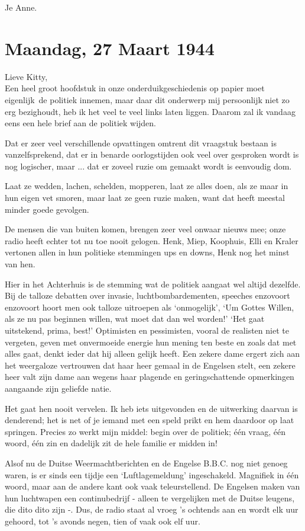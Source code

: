 \documentclass{book}
\begin{document}
Je Anne.

\section*{Maandag, 27 Maart 1944}

Lieve Kitty,\\
Een heel groot hoofdstuk in onze onderduikgeschiedenis op papier
moet eigenlijk~de politiek innemen, maar daar dit onderwerp mij persoonlijk niet
zo erg bezighoudt, heb ik het veel te veel links laten liggen. Daarom zal ik
vandaag eens een hele brief aan de politiek wijden.

Dat er zeer veel verschillende opvattingen omtrent dit vraagstuk bestaan is
vanzelfsprekend, dat er in benarde oorlogstijden ook veel over gesproken wordt
is nog logischer, maar ... dat er zoveel ruzie om gemaakt wordt is eenvoudig
dom.

Laat ze wedden, lachen, schelden, mopperen, laat ze alles doen, als ze maar in
hun eigen vet smoren, maar laat ze geen ruzie maken, want dat heeft meestal
minder goede gevolgen.

De mensen die van buiten komen, brengen zeer veel onwaar nieuws mee; onze radio
heeft echter tot nu toe nooit gelogen. Henk, Miep, Koophuis, Elli en Kraler
vertonen allen in hun politieke stemmingen ups en downs, Henk nog het minst van
hen.

Hier in het Achterhuis is de stemming wat de politiek aangaat wel altijd
dezelfde. Bij de talloze debatten over invasie, luchtbombardementen, speeches
enzovoort enzovoort hoort men ook talloze uitroepen als `onmogelijk', `Um Gottes
Willen, als ze nu pas beginnen willen, wat moet dat dan wel worden!' `Het gaat
uitstekend, prima, best!' Optimisten en pessimisten, vooral de realisten niet te
vergeten, geven met onvermoeide energie hun mening ten beste en zoals dat met
alles gaat, denkt ieder dat hij alleen gelijk heeft. Een zekere dame ergert zich
aan het weergaloze vertrouwen dat haar heer gemaal in de Engelsen stelt, een
zekere heer valt zijn dame aan wegens haar plagende en geringschattende
opmerkingen aangaande zijn geliefde natie.

Het gaat hen nooit vervelen. Ik heb iets uitgevonden en de uitwerking daarvan is
denderend; het is net of je iemand met een speld prikt en hem daardoor op laat
springen. Precies zo werkt mijn middel: begin over de politiek; één vraag, één
woord, één zin en dadelijk zit de hele familie er midden in!

Alsof nu de Duitse Weermachtberichten en de Engelse B.B.C. nog niet genoeg
waren, is er sinds een tijdje een `Luftlagemeldung' ingeschakeld.  Magnifiek in
één woord, maar aan de andere kant ook vaak teleurstellend.  De Engelsen maken
van hun luchtwapen een continubedrijf - alleen te vergelijken met de Duitse
leugens, die dito dito zijn -. Dus, de radio staat al vroeg 's ochtends aan en
wordt elk uur gehoord, tot 's avonds negen, tien of vaak ook elf uur.
\end{document}

